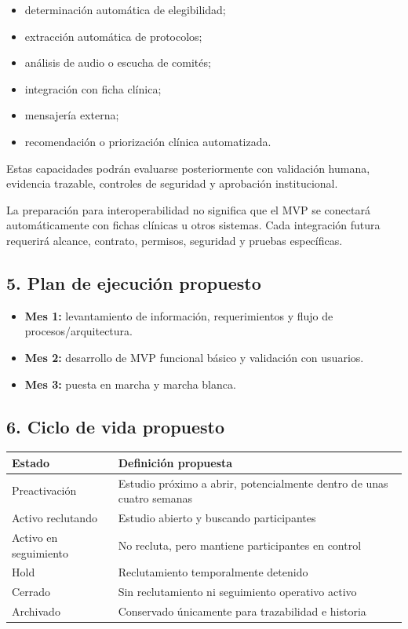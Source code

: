 \documentclass[
]{article}
\providecommand{\tightlist}{%
  \setlength{\itemsep}{0pt}\setlength{\parskip}{0pt}}
\begin{document}
\begin{itemize}
\tightlist
\item
  determinación automática de elegibilidad;
\item
  extracción automática de protocolos;
\item
  análisis de audio o escucha de comités;
\item
  integración con ficha clínica;
\item
  mensajería externa;
\item
  recomendación o priorización clínica automatizada.
\end{itemize}

Estas capacidades podrán evaluarse posteriormente con validación humana,
evidencia trazable, controles de seguridad y aprobación institucional.

La preparación para interoperabilidad no significa que el MVP se
conectará automáticamente con fichas clínicas u otros sistemas. Cada
integración futura requerirá alcance, contrato, permisos, seguridad y
pruebas específicas.

\hypertarget{5-plan-de-ejecuciuxf3n-propuesto}{%
\subsection{5. Plan de ejecución
propuesto}\label{5-plan-de-ejecuciuxf3n-propuesto}}

\begin{itemize}
\tightlist
\item
  \textbf{Mes 1:} levantamiento de información, requerimientos y flujo
  de procesos/arquitectura.
\item
  \textbf{Mes 2:} desarrollo de MVP funcional básico y validación con
  usuarios.
\item
  \textbf{Mes 3:} puesta en marcha y marcha blanca.
\end{itemize}

\hypertarget{6-ciclo-de-vida-propuesto}{%
\subsection{6. Ciclo de vida
propuesto}\label{6-ciclo-de-vida-propuesto}}

\begin{longtable}[]{@{}ll@{}}
\toprule\noalign{}
Estado & Definición propuesta \\
\midrule\noalign{}
\endhead
\bottomrule\noalign{}
\endlastfoot
Preactivación & Estudio próximo a abrir, potencialmente dentro de unas
cuatro semanas \\
Activo reclutando & Estudio abierto y buscando participantes \\
Activo en seguimiento & No recluta, pero mantiene participantes en
control \\
Hold & Reclutamiento temporalmente detenido \\
Cerrado & Sin reclutamiento ni seguimiento operativo activo \\
Archivado & Conservado únicamente para trazabilidad e historia \\
\end{longtable}
\end{document}
